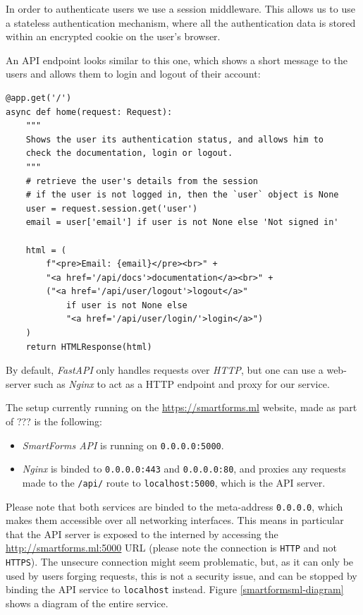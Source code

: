 \documentclass[11pt, a4paper]{report}
\def\code#1{\texttt{#1}}
\begin{document}
In order to authenticate users we use a session middleware. This allows us to use a stateless authentication mechanism, where all the authentication data is stored within an encrypted cookie on the user's browser.

An API endpoint looks similar to this one, which shows a short message to the users and allows them to login and logout of their account:

\begin{verbatim}
@app.get('/')
async def home(request: Request):
    """
    Shows the user its authentication status, and allows him to
    check the documentation, login or logout.
    """
    # retrieve the user's details from the session
    # if the user is not logged in, then the `user` object is None
    user = request.session.get('user')
    email = user['email'] if user is not None else 'Not signed in'

    html = (
        f"<pre>Email: {email}</pre><br>" +
        "<a href='/api/docs'>documentation</a><br>" +
        ("<a href='/api/user/logout'>logout</a>"
            if user is not None else
            "<a href='/api/user/login/'>login</a>")
    )
    return HTMLResponse(html)
\end{verbatim}

By default, \textit{FastAPI} only handles requests over \textit{HTTP}, but one can use a web-server such as \textit{Nginx} \cite{nginx} to act as a HTTP endpoint and proxy for our service.

The setup currently running on the \url{https://smartforms.ml} website, made as part of ???\cite{felix} is the following:
\begin{itemize}
	\item \textit{SmartForms API} is running on \code{0.0.0.0:5000}.
	\item \textit{Nginx} is binded to \code{0.0.0.0:443} and \code{0.0.0.0:80}, and proxies any requests made to the \code{/api/} route to \code{localhost:5000}, which is the API server. 
\end{itemize}

Please note that both services are binded to the meta-address \code{0.0.0.0}, which makes them accessible over all networking interfaces. This means in particular that the API server is exposed to the interned by accessing the \url{http://smartforms.ml:5000} URL (please note the connection is \code{HTTP} and not \code{HTTPS}). The unsecure connection might seem problematic, but, as it can only be used by users forging requests, this is not a security issue, and can be stopped by binding the API service to \code{localhost} instead. Figure \ref{smartformsml-diagram} shows a diagram of the entire service.
\end{document}
